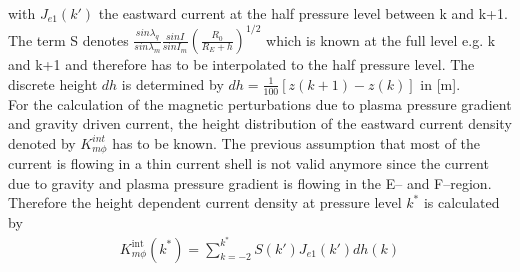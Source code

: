 % 
with $J_{e1}(k')$ the eastward current at the half pressure level between k and k+1.
The term S denotes $\frac{sin \lambda_q}{sin \lambda_m}\frac{sin I}{sin I_m}
(\frac{R_0}{R_E+h})^{1/2}$ which is known at the full level e.g. k and k+1
and therefore has to be interpolated to the half pressure level. 
The discrete height
$dh$ is determined by $dh = \frac{1}{100} [z(k+1) - z(k)]$ in [m]. \\
%
For the
calculation of the magnetic perturbations due to plasma pressure gradient and
gravity driven current, the height distribution of the eastward current density denoted by 
$K_{m \phi}^{int}$ has to be known. The previous assumption that most of the current is
flowing in a thin current shell is not valid anymore since the current due to
gravity and plasma pressure gradient is flowing in the E-- and F--region.
Therefore the height dependent current density at pressure level $k^*$ is
calculated by
%
\begin{align}
  K_{m \phi}^{\text{int}}(k^*) = \sum_{k=-2}^{k^*} S(k')
    J_{e1}(k') dh(k)\label{eq:kqphi_int}
\end{align}
% 

